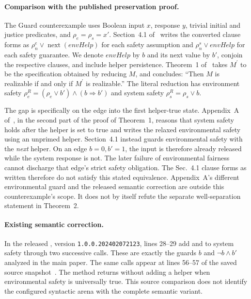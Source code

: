 \documentclass[11pt]{article}
\begin{document}
\paragraph{Comparison with the published preservation proof.}
The Guard counterexample uses Boolean input $x$, response $y$,
trivial initial and justice predicates, and $\rho_e=\rho_s=x'$.
Section~4.1 of~\cite[p.~4]{kind} writes the converted clause forms as
$\rho_n^e\lor\operatorname{next}(\mathit{envHelp})$ for each safety assumption
and $\rho_n^s\lor\mathit{envHelp}$ for each safety guarantee.
We denote $\mathit{envHelp}$ by $b$ and its next value by $b'$,
conjoin the respective clauses, and include helper persistence.
Theorem~1 of~\cite[p.~5]{kind} takes $M^\prime$ to be the specification
obtained by reducing $M$, and concludes: ``Then $M$ is realizable if and
only if $M^\prime$ is realizable.''
The literal reduction has environment safety
$\rho_e^R=(\rho_e\lor b')\land(b\Rightarrow b')$ and system safety
$\rho_s^R=\rho_s\lor b$.

The gap is specifically on the edge into the first helper-true state.
Appendix~A of~\cite[pp.~12--13]{kind}, in the second part of the proof
of Theorem~1, reasons that system safety holds after the helper is
set to true and writes the relaxed environmental safety using an
unprimed helper. Section~4.1 instead guards environmental safety
with the \emph{next} helper. On an edge $b=0,b'=1$, the input is
therefore already released while the system response is not.
The later failure of environmental fairness cannot discharge that
edge's strict safety obligation. The Sec.~4.1 clause forms as written therefore do not satisfy this stated
equivalence. Appendix~A's different environmental guard and the released
semantic correction are outside this counterexample's scope. It does not
by itself refute the separate well-separation statement in Theorem~2.

\paragraph{Existing semantic correction.}
In the released , version
\texttt{1.0.0.202402072123},  lines 28--29 add
 and
 to system safety through
two successive  calls. These are exactly the guards
$b$ and $\neg b\land b'$ analyzed in the main paper. The same calls
appear at lines 56--57 of the saved source snapshot~\cite{spectrasnapshot}.
The method returns without adding a helper when environmental safety
is universally true. This source comparison does not identify the
configured syntactic arena with the complete semantic variant.
\end{document}
